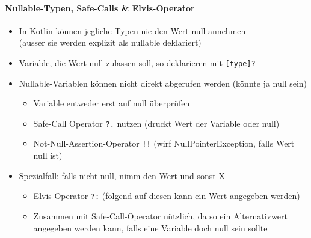 \documentclass[a4paper]{article}
\begin{document}
			\paragraph{Nullable-Typen, Safe-Calls \& Elvis-Operator}
			\begin{itemize}
				\item In Kotlin können jegliche Typen nie den Wert null annehmen\\ 
					(ausser sie werden explizit als nullable deklariert)
				\item Variable, die Wert null zulassen soll, so deklarieren mit \texttt{[type]?}
				\item Nullable-Variablen können nicht direkt abgerufen werden (könnte ja null sein)
				\begin{itemize}
					\item Variable entweder erst auf null überprüfen
					\item Safe-Call Operator \texttt{?.} nutzen (druckt Wert der Variable oder null)
					\item Not-Null-Assertion-Operator \texttt{!!} (wirf NullPointerException, falls Wert null ist)
				\end{itemize}
				\item Spezialfall: falls nicht-null, nimm den Wert und sonst X
				\begin{itemize}
					\item Elvis-Operator \texttt{?:} (folgend auf diesen kann ein Wert angegeben werden)
					\item Zusammen mit Safe-Call-Operator nützlich, da so ein Alternativwert angegeben werden kann, falls eine Variable doch null sein sollte
				\end{itemize}
			\end{itemize}
		
\end{document}

